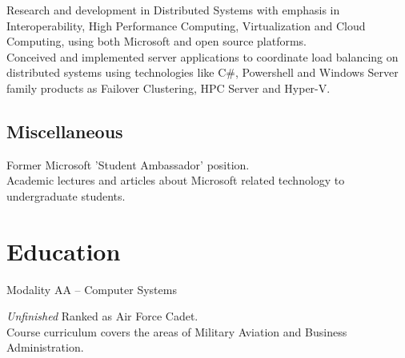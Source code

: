 \documentclass[11pt, a4paper, sans]{moderncv} %
\begin{document}
{
Research and development in Distributed Systems with emphasis in Interoperability, High Performance Computing, Virtualization and Cloud Computing, using both Microsoft and open source platforms.\\
Conceived and implemented server applications to coordinate load balancing on distributed systems using technologies like C\#, Powershell and Windows Server family products as Failover Clustering, HPC Server and Hyper-V.
}




\subsection{Miscellaneous}




{
Former Microsoft 'Student Ambassador' position.\\
Academic lectures and articles about Microsoft related technology to undergraduate students.
}









\section{Education}

{
Modality AA -- Computer Systems
}  

{\textit{Unfinished}}
{
Ranked as Air Force Cadet. \\
Course curriculum covers the areas of Military Aviation and Business Administration. 
}
\end{document}
